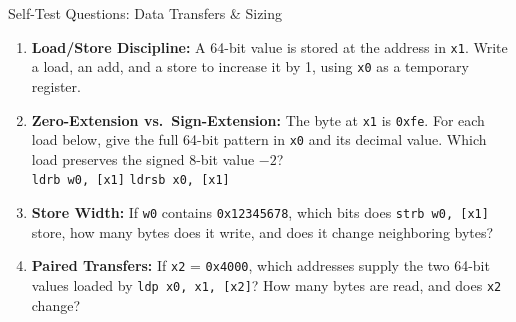 \documentclass[aspectratio=169,11pt,t]{beamer}
\newcommand{\key}[1]{\textbf{#1}}
\newcommand{\bits}[1]{\texttt{#1}}
\newcommand{\hex}[1]{\texttt{0x#1}}
\newcommand{\code}[1]{\texttt{#1}}
\begin{document}
\begin{frame}{Self-Test Questions: Data Transfers \& Sizing}

\begin{enumerate}\setlength{\itemsep}{7pt}
  \item \key{Load/Store Discipline:} A 64-bit value is stored at the address in \bits{x1}. Write a load, an add, and a store to increase it by 1, using \bits{x0} as a temporary register.

  \item \key{Zero-Extension vs.\ Sign-Extension:} The byte at \bits{x1} is \hex{fe}. For each load below, give the full 64-bit pattern in \bits{x0} and its decimal value. Which load preserves the signed 8-bit value $-2$?\\[0.08cm]
  \code{ldrb w0, [x1]} \qquad \code{ldrsb x0, [x1]}

  \item \key{Store Width:} If \bits{w0} contains \hex{12345678}, which bits does \code{strb w0, [x1]} store, how many bytes does it write, and does it change neighboring bytes?

  \item \key{Paired Transfers:} If \bits{x2} = \hex{4000}, which addresses supply the two 64-bit values loaded by \code{ldp x0, x1, [x2]}? How many bytes are read, and does \bits{x2} change?
\end{enumerate}

\end{frame}

\end{document}
